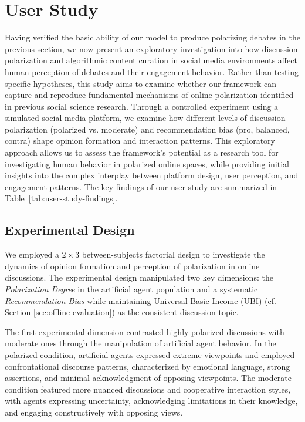 \section{User Study}

Having verified the basic ability of our model to produce polarizing debates in the previous section, we now present an exploratory investigation into how discussion polarization and algorithmic content curation in social media environments affect human perception of debates and their engagement behavior. Rather than testing specific hypotheses, this study aims to examine whether our framework can capture and reproduce fundamental mechanisms of online polarization identified in previous social science research. Through a controlled experiment using a simulated social media platform, we examine how different levels of discussion polarization (polarized vs. moderate) and recommendation bias (pro, balanced, contra) shape opinion formation and interaction patterns. This exploratory approach allows us to assess the framework's potential as a research tool for investigating human behavior in polarized online spaces, while providing initial insights into the complex interplay between platform design, user perception, and engagement patterns. The key findings of our user study are summarized in Table~\ref{tab:user-study-findings}.

\subsection{Experimental Design}

We employed a $2 \times 3$ between-subjects factorial design to investigate the dynamics of opinion formation and perception of polarization in online discussions. The experimental design manipulated two key dimensions: the \emph{Polarization Degree} in the artificial agent population and a systematic \emph{Recommendation Bias} while maintaining Universal Basic Income (UBI) (cf. Section \ref{sec:offline-evaluation}) as the consistent discussion topic.

The first experimental dimension contrasted highly polarized discussions with moderate ones through the manipulation of artificial agent behavior. In the polarized condition, artificial agents expressed extreme viewpoints and employed confrontational discourse patterns, characterized by emotional language, strong assertions, and minimal acknowledgment of opposing viewpoints. The moderate condition featured more nuanced discussions and cooperative interaction styles, with agents expressing uncertainty, acknowledging limitations in their knowledge, and engaging constructively with opposing views.

